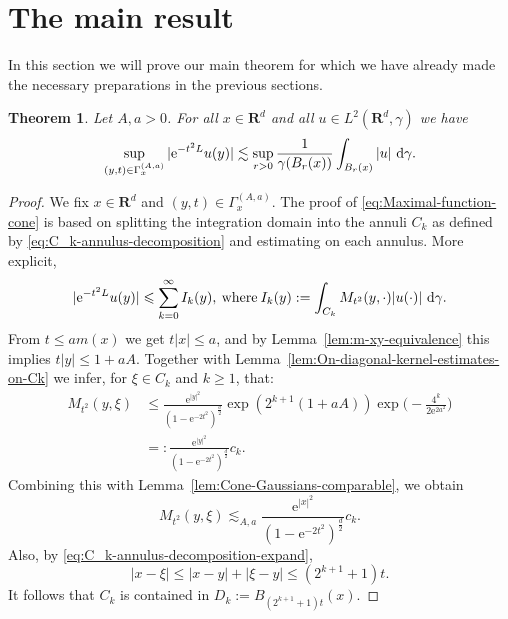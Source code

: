 \documentclass{amsart}
\newtheorem{theorem}{Theorem}
\theoremstyle{remark}
\newcommand{\D}{\,\textup{d}}
\newcommand{\LHG}{{L^2(\R^d,\gamma)}}
\renewcommand{\leq}{\leqslant}
\renewcommand{\geq}{\geqslant}
\newcommand{\R}{\mathbf R}
\newcommand{\e}{\mathrm{e}} %
\begin{document}
\section{The main result}
In this section we will prove our main theorem for which we have already made
the necessary preparations in the previous sections.
\begin{theorem}\label{thm:Gaussian-maximal-function}
  Let $A, a > 0$. For all $x \in \R^d$ and all $u \in \LHG$ we have
  \begin{equation}
    \label{eq:Maximal-function-cone}
    \sup_{(y, t) \in \Gamma_x^{(A, a)}} |\e^{-t^2 L} u(y)| \lesssim
    \sup_{r > 0} \frac1{\gamma(B_r(x))}\int_{B_r(x)} |u| \, \D\gamma.
  \end{equation}
\end{theorem}
\begin{proof}
  We fix $x \in \R^d$ and $ (y, t) \in \Gamma_x^{(A, a)}$. The proof of
  \eqref{eq:Maximal-function-cone} is based on splitting the
  integration domain into the annuli $C_k$ as defined by
  \eqref{eq:C_k-annulus-decomposition} and estimating on each annulus. More
  explicit,
  \begin{equation}
    \label{eq:Maximal-function-cone-intermediate-step-1}
    |\e^{-t^2 L} u(y)| \leq \sum_{k = 0}^\infty I_k(y),
    \:\text{where}\: I_k(y) := \int_{C_k} M_{t^2}(y, \cdot) |u(\cdot)|
    \,\D\gamma.
  \end{equation} 
  From $t \leq a m(x)$ we get $t |x| \leq a$, and by
  Lemma~\ref{lem:m-xy-equivalence} this implies $t |y| \leq 1 + aA$. Together
  with Lemma~\ref{lem:On-diagonal-kernel-estimates-on-Ck} we infer, for $\xi
  \in C_k$ and $k \geq 1$, that:
  \begin{align*}
    \label{eq:Mehler-kernel-estimate-one-sided-bound-1}
    M_{t^2}(y, \xi) &\leq \frac{\e^{|y|^2}}{(1 - \e^{-2t^2})^{\frac{d}2}}
    \exp(2^{k + 1} (1 + aA)) \exp\Big(-\frac{4^k}{2 \e^{2 a^2}} \Bigr)\\
    &=: \frac{\e^{|y|^2}}{(1 - \e^{-2t^2})^{\frac{d}2}} c_k.
  \end{align*}
  Combining this with Lemma~\ref{lem:Cone-Gaussians-comparable}, we obtain
  \begin{equation}
    \label{eq:Mehler-kernel-estimate-one-sided-bound-1}
    M_{t^2}(y, \xi) \lesssim_{A, a} \frac{\e^{|x|^2}}{(1 - \e^{-2t^2})^{\frac{d}2}} c_k.
  \end{equation}       
  Also, by \eqref{eq:C_k-annulus-decomposition-expand},
  \begin{equation*}
    |x - \xi| \leq |x - y| + |\xi - y| \leq (2^{k + 1} + 1) t .
  \end{equation*}
  It follows that $C_k$ is contained in $D_k := B_{(2^{k + 1} + 1) t}(x)$.


\end{proof}
\end{document}
